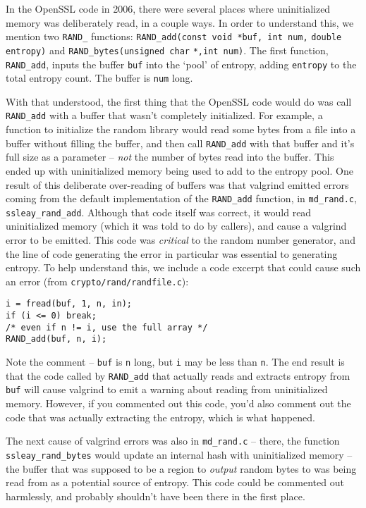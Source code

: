 \documentclass[conference]{IEEEtran}
\begin{document}
In the OpenSSL code in 2006, there were several places where
uninitialized memory was deliberately read, in a couple ways. In order
to understand this, we mention two \verb|RAND_| functions:
\verb|RAND_add(const void *buf, int num,|
\verb|double entropy)| and \verb|RAND_bytes(unsigned char|
\verb|*,int num)|. The first function,
\verb|RAND_add|, inputs the buffer \verb|buf| into the `pool' of
entropy, adding \verb|entropy| to the total entropy count. The buffer
is \verb|num| long.

With that understood, the first thing that the OpenSSL code would do
was call \verb|RAND_add| with a buffer that wasn't completely
initialized\cite{3}. For example, a function to initialize the random
library would read some bytes from a file into a buffer without
filling the buffer, and then call \verb|RAND_add| with that buffer and
it's full size as a parameter -- \emph{not} the number of bytes read
into the buffer. This ended up with uninitialized memory being used to
add to the entropy pool. One result of this deliberate over-reading of
buffers was that valgrind emitted errors coming from the default
implementation of the \verb|RAND_add| function, in \verb|md_rand.c|,
\verb|ssleay_rand_add|. Although that code itself was correct, it
would read uninitialized memory (which it was told to do by callers),
and cause a valgrind error to be emitted. This code was
\emph{critical} to the random number generator, and the line of code
generating the error in particular was essential to generating
entropy. To help understand this, we include a code excerpt that could
cause such an error (from \verb|crypto/rand/randfile.c|):

\begin{verbatim}
i = fread(buf, 1, n, in);
if (i <= 0) break;
/* even if n != i, use the full array */
RAND_add(buf, n, i);
\end{verbatim}

Note the comment -- \verb|buf| is \verb|n| long, but \verb|i| may be
less than \verb|n|. The end result is that the code called by
\verb|RAND_add| that actually reads and extracts entropy from
\verb|buf| will cause valgrind to emit a warning about reading from
uninitialized memory. However, if you commented out this code, you'd
also comment out the code that was actually extracting the entropy,
which is what happened.

The next cause of valgrind errors was also in
\verb|md_rand.c| -- there, the function \verb|ssleay_rand_bytes| would
update an internal hash with uninitialized memory -- the buffer that
was supposed to be a region to \emph{output} random bytes to was being
read from as a potential source of entropy. This code could be
commented out harmlessly, and probably shouldn't have been there in
the first place.
\end{document}
